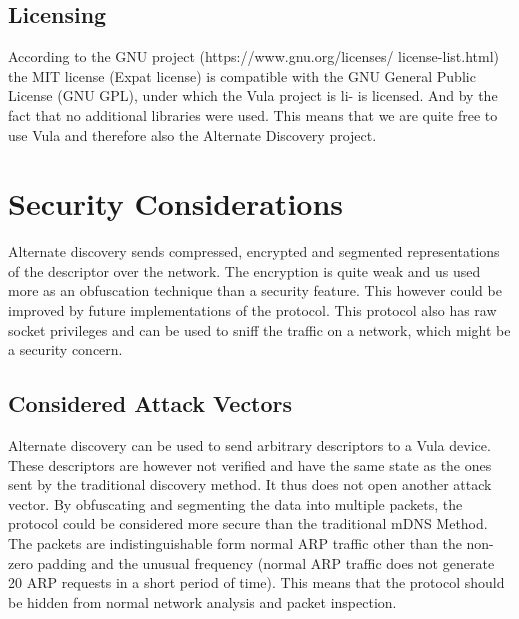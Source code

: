 \documentclass[a4paper,11pt]{report}
\begin{document}
\section{Licensing}
According to the GNU project (https://www.gnu.org/licenses/
license-list.html) the MIT license (Expat license) is compatible with
the GNU General Public License (GNU GPL), under which the Vula project is li-
is licensed.
And by the fact that no additional libraries were used. This means that we are quite free to use Vula and therefore also the Alternate Discovery project.
\chapter{Security Considerations}
Alternate discovery sends compressed, encrypted and segmented representations of the descriptor over the network. The encryption is quite weak and us used more as an obfuscation technique than a security feature. This however could be improved by future implementations of the protocol. This protocol also has raw socket privileges and can be used to sniff the traffic on a network, which might be a security concern.
\section{Considered Attack Vectors}
Alternate discovery can be used to send arbitrary descriptors to a Vula device. These descriptors are however not verified and have the same state as the ones sent by the traditional discovery method. It thus does not open another attack vector. By obfuscating and segmenting the data into multiple packets, the protocol could be considered more secure than the traditional mDNS Method. The packets are indistinguishable form normal ARP traffic other than the non-zero padding and the unusual frequency (normal ARP traffic does not generate 20 ARP requests in a short period of time). This means that the protocol should be hidden from normal network analysis and packet inspection.
\newpage
\end{document}
